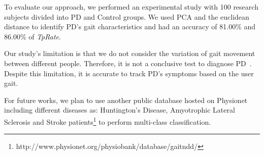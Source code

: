 \documentclass[10pt, conference, compsocconf]{IEEEtran}
\begin{document}
To evaluate our approach, we performed an experimental study with 100 research subjects divided into PD and Control groups. We used PCA and the euclidean distance to identify PD's gait characteristics and had an accuracy of 81.00\% and 86.00\% of \textit{TpRate}. 

Our study's limitation is that we do not consider the variation of gait movement between different people. Therefore, it is not a conclusive test to diagnose PD~\cite{gaitusingsensorsreview2012, national2006parkinson}. Despite this limitation, it is accurate to track PD's symptoms based on the user gait.

For future works, we plan to use another public database hosted on Physionet~\cite{physionet} including different diseases as: Huntington's Disease, Amyotrophic Lateral Sclerosis and Stroke patients\footnote{http://www.physionet.org/physiobank/database/gaitndd/} to perform multi-class classification. 







\end{document}
